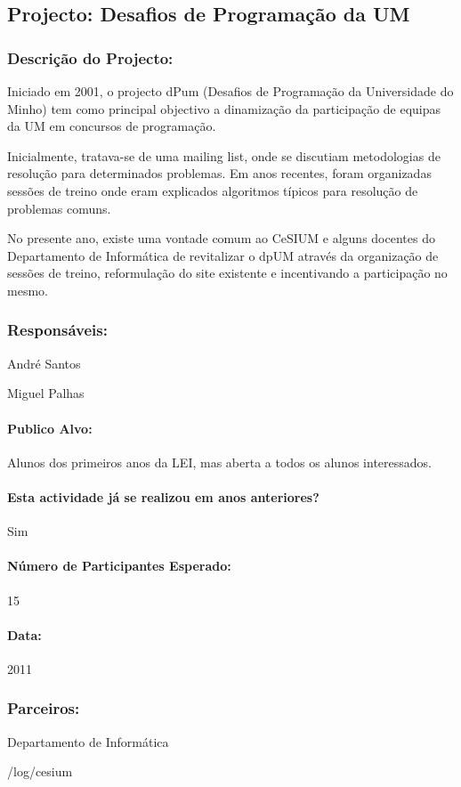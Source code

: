 \subsection{Projecto: Desafios de Programação da UM} %

\subsubsection*{Descrição do Projecto:}
Iniciado em 2001, o projecto dPum (Desafios de Programação da Universidade do Minho) tem como principal objectivo a dinamização da participação de equipas da UM em concursos de programação.

Inicialmente, tratava-se de uma mailing list, onde se discutiam metodologias de resolução para determinados problemas.
Em anos recentes, foram organizadas sessões de treino onde eram explicados algoritmos típicos para resolução de problemas comuns.

No presente ano, existe uma vontade comum ao CeSIUM e alguns docentes do Departamento de Informática de revitalizar o dpUM através da organização de sessões de treino, reformulação do site existente e incentivando a participação no mesmo. 


\subsubsection*{Responsáveis:}
\begin{itemizedash}
	\item{André Santos}
	\item{Miguel Palhas}
\end{itemizedash}

\paragraph{Publico Alvo:}
Alunos dos primeiros anos da LEI, mas aberta a todos os alunos interessados.

\paragraph{Esta actividade já se realizou em anos anteriores?}
Sim

\paragraph{Número de Participantes Esperado:}
15

\paragraph{Data:} 2011

\subsubsection*{Parceiros:}
\begin{itemizedash}
    \item{Departamento de Informática}
	\item{/log/cesium}
\end{itemizedash}

\vspace{20pt}
